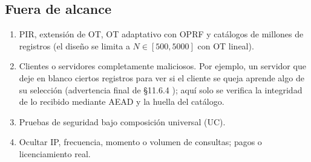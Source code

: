 \subsection{Fuera de alcance}
\begin{enumerate}
\item PIR, extensi\'on de OT, OT adaptativo con OPRF y cat\'alogos de
millones de registros (el dise\~no se limita a $N\in[500,5000]$ con OT lineal).
\item Clientes o servidores completamente maliciosos. Por ejemplo, un
servidor que deje en blanco ciertos registros para ver si el cliente se
queja aprende algo de su selecci\'on (advertencia final de \S11.6.4
\cite{boneh-shoup-v06}); aqu\'i solo se verifica la integridad de lo
recibido mediante AEAD y la huella del cat\'alogo.
\item Pruebas de seguridad bajo composici\'on universal (UC).
\item Ocultar IP, frecuencia, momento o volumen de consultas; pagos o
licenciamiento real.
\end{enumerate}
